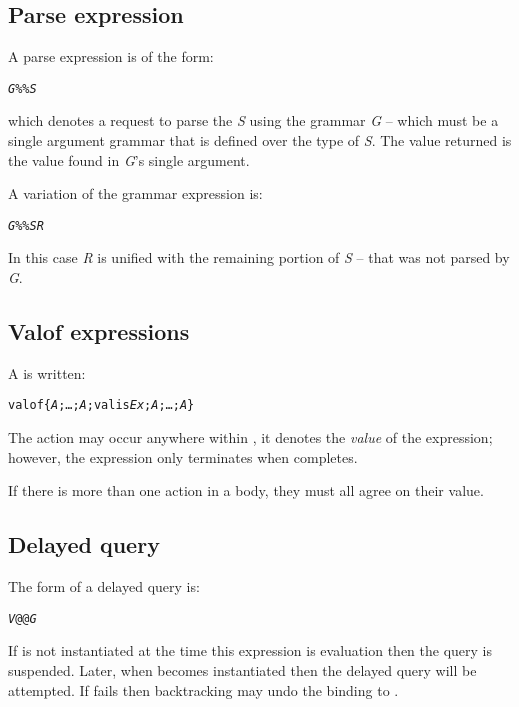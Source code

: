 \subsection{Parse expression}
\label{expression:grammarexp}

A parse expression is of the form:
\begin{alltt}
\emph{G} \%\% \emph{S}
\end{alltt}
which denotes a request to parse the \emph{S} using the grammar \emph{G} -- which must be a single argument grammar that is defined over the type of \emph{S}. The value returned is the value found in \emph{G}'s single argument.

A variation of the grammar expression is:
\begin{alltt}
\emph{G} \%\% \emph{S} \tilda\emph{R}
\end{alltt}
In this case \emph{R} is unified with the remaining portion of \emph{S} -- that was not parsed by \emph{G}.

\subsection{Valof expressions}
\label{expression:valof}
A  is written:
\begin{alltt}
valof\{ \emph{A};\ldots;\emph{A};valis \emph{Ex};\emph{A};\ldots;\emph{A\subn}\}
\end{alltt}
The  action may occur anywhere within , it denotes the \emph{value} of the  expression; however, the expression only terminates when  completes.

If there is more than one  action in a  body, they must all  agree on their value.


\subsection{Delayed query}
\label{goal:delayed}
The form of a delayed query is:
\begin{alltt}
\emph{V} @@ \emph{G}
\end{alltt}
If  is not instantiated at the time this expression is evaluation then the query  is suspended. Later, when  becomes instantiated then the delayed query  will be attempted. If  fails then backtracking may undo the binding to .

